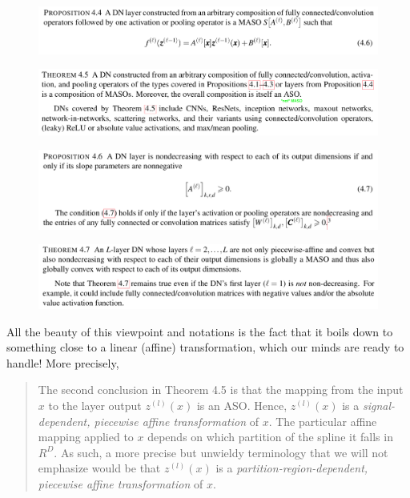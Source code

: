 \documentclass{article}
\begin{document}
\begin{figure}[h]
	\begin{center}
		\includegraphics[width=.8\linewidth]{Figure/prop4p4}
		\label{fig:prop4p4}
	\end{center}
\end{figure}


\begin{figure}[h]
	\begin{center}
		\includegraphics[width=.8\linewidth]{Figure/prop4p5}
		\label{fig:prop4p5}
	\end{center}
\end{figure}

\begin{figure}[h]
	\begin{center}
		\includegraphics[width=.8\linewidth]{Figure/prop4p6}
		\label{fig:prop4p6}
	\end{center}
\end{figure}

\begin{figure}[h]
	\begin{center}
		\includegraphics[width=.8\linewidth]{Figure/prop4p7}
		\label{fig:prop4p7}
	\end{center}
\end{figure}


All the beauty of this viewpoint and notations is the fact that it boils down to something close to a linear (affine) transformation, which our minds are ready to handle! More precisely,
\begin{quote}
	The second conclusion in Theorem 4.5 is that the mapping from the input $x$ to the layer output $z^{(l)}(x)$ is an ASO. Hence, $z^{(l)}(x)$ is a \emph{signal-dependent, piecewise affine transformation} of $x$. The particular affine mapping applied to $x$ depends on which partition of the spline it falls in $R^D$.  As such, a more precise but unwieldy terminology that we will not emphasize would be that $z^{(l)}(x)$ is a \emph{partition-region-dependent, piecewise affine transformation} of $x$.
\end{quote}
\end{document}
